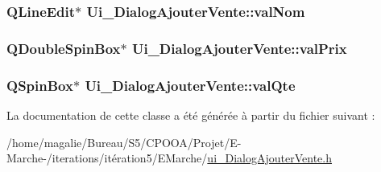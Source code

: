 \hypertarget{class_ui___dialog_ajouter_vente_a7f6dc97a576b62dc8412a347ec2acb25}{
\subsubsection[{val\-Nom}]{\setlength{\rightskip}{0pt plus 5cm}Q\-Line\-Edit$\ast$ Ui\-\_\-\-Dialog\-Ajouter\-Vente\-::val\-Nom}}\label{class_ui___dialog_ajouter_vente_a7f6dc97a576b62dc8412a347ec2acb25}
\hypertarget{class_ui___dialog_ajouter_vente_a125862f438ab182a8a49357a91bb37ef}{
\subsubsection[{val\-Prix}]{\setlength{\rightskip}{0pt plus 5cm}Q\-Double\-Spin\-Box$\ast$ Ui\-\_\-\-Dialog\-Ajouter\-Vente\-::val\-Prix}}\label{class_ui___dialog_ajouter_vente_a125862f438ab182a8a49357a91bb37ef}
\hypertarget{class_ui___dialog_ajouter_vente_a763e8a0d9e253d6da640fbac8b02459c}{
\subsubsection[{val\-Qte}]{\setlength{\rightskip}{0pt plus 5cm}Q\-Spin\-Box$\ast$ Ui\-\_\-\-Dialog\-Ajouter\-Vente\-::val\-Qte}}\label{class_ui___dialog_ajouter_vente_a763e8a0d9e253d6da640fbac8b02459c}


La documentation de cette classe a été générée à partir du fichier suivant \-:\begin{DoxyCompactItemize}
\item 
/home/magalie/\-Bureau/\-S5/\-C\-P\-O\-O\-A/\-Projet/\-E-\/\-Marche-\//iterations/itération5/\-E\-Marche/\hyperlink{ui___dialog_ajouter_vente_8h}{ui\-\_\-\-Dialog\-Ajouter\-Vente.\-h}\end{DoxyCompactItemize}
